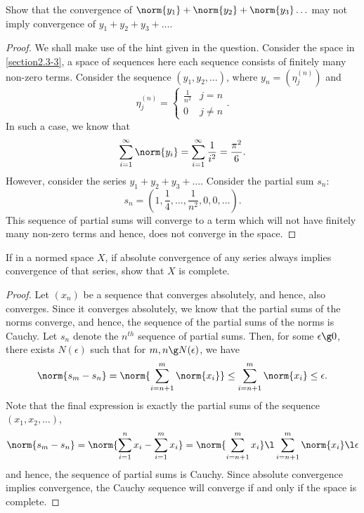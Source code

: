 \begin{question}
    Show that the convergence of $\norm{y_1} + \norm{y_2} + \norm{y_3} \ldots$ may not imply convergence of $y_1 + y_2 + y_3+ \ldots$.
    \label{section2.3-7}
\end{question}
\begin{proof}
    We shall make use of the hint given in the question. Consider the space in \ref{section2.3-3}, a space of sequences here each sequence consists of finitely many non-zero terms. Consider the sequence $(y_1 , y_2 , \ldots)$, where $y_n = (\eta_j^{(n)})$ and 
    \[\eta_j^{(n)} = \begin{cases}
        \frac{1}{n^2} & j = n
        \\
        0 & j \neq n
    \end{cases}.\]
    In such a case, we know that
    \[\sum_{i=1}^\infty \norm{y_i} = \sum_{i=1}^\infty \frac{1}{i^2} = \frac{\pi^2}{6}.\]
    However, consider the series $y_1 + y_2 + y_3 + \ldots$. Consider the partial sum $s_n$:
    \[s_n = \left(1 , \frac{1}{4} , \ldots , \frac{1}{n^2} , 0 ,0 , \ldots \right).\]
    This sequence of partial sums will converge to a term which will not have finitely many non-zero terms and hence, does not converge in the space.
\end{proof}

\begin{question}
    If in a normed space $X$, if absolute convergence of any series always implies convergence of that series, show that $X$ is complete.
    \label{section2.3-8}
\end{question}
\begin{proof}
    Let $(x_n)$ be a sequence that converges absolutely, and hence, also converges. Since it converges absolutely, we know that the partial sums of the norms converge, and hence, the sequence of the partial sums of the norms is Cauchy. Let $s_n$ denote the $n^{th}$ sequence of partial sums. Then, for some $\epsilon \g 0$, there exists $N(\epsilon)$ such that for $m,n \g N(\epsilon)$, we have
    \[\norm{s_m - s_n} = \norm{\sum_{i=n+1}^m \norm{x_i}} \leq \sum_{i=n+1}^m \norm{x_i} \leq \epsilon.\]
    Note that the final expression is exactly the partial sums of the sequence $(x_1 , x_2 , \ldots)$, 
    \[\norm{s_m - s_n} = \norm{\sum_{i=1}^n x_i - \sum_{i=1}^m x_i} = \norm{\sum_{i=n+1}^{m} x_i} \l \sum_{i=n+1}^{m} \norm{x_i} \l \epsilon\]
    and hence, the sequence of partial sums is Cauchy. Since absolute convergence implies convergence, the Cauchy sequence will converge if and only if the space is complete.
\end{proof}

